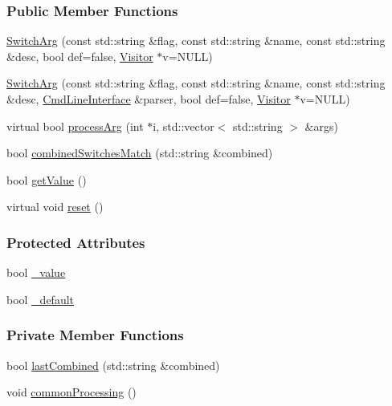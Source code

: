 \subsubsection*{Public Member Functions}
\begin{DoxyCompactItemize}
\item 
\hyperlink{classTCLAP_1_1SwitchArg_a3895b036fa2d36e4fcfa41dfcdb298c1}{Switch\+Arg} (const std\+::string \&flag, const std\+::string \&name, const std\+::string \&desc, bool def=false, \hyperlink{classTCLAP_1_1Visitor}{Visitor} $\ast$v=N\+U\+LL)
\item 
\hyperlink{classTCLAP_1_1SwitchArg_af7e9628155772af0686f6a2114dfe78b}{Switch\+Arg} (const std\+::string \&flag, const std\+::string \&name, const std\+::string \&desc, \hyperlink{classTCLAP_1_1CmdLineInterface}{Cmd\+Line\+Interface} \&parser, bool def=false, \hyperlink{classTCLAP_1_1Visitor}{Visitor} $\ast$v=N\+U\+LL)
\item 
virtual bool \hyperlink{classTCLAP_1_1SwitchArg_a624f98df6c4907efec95ffc353e9d08c}{process\+Arg} (int $\ast$i, std\+::vector$<$ std\+::string $>$ \&args)
\item 
bool \hyperlink{classTCLAP_1_1SwitchArg_af5fbd44d462539941b09e960034d692c}{combined\+Switches\+Match} (std\+::string \&combined)
\item 
bool \hyperlink{classTCLAP_1_1SwitchArg_aed1bc8a81a9bda4013cfcf407ccc7716}{get\+Value} ()
\item 
virtual void \hyperlink{classTCLAP_1_1SwitchArg_af8561d903ec3c11f5f2175e6db179d9c}{reset} ()
\end{DoxyCompactItemize}
\subsubsection*{Protected Attributes}
\begin{DoxyCompactItemize}
\item 
bool \hyperlink{classTCLAP_1_1SwitchArg_a0389ecebecc504d9756703d46e8cf3ca}{\+\_\+value}
\item 
bool \hyperlink{classTCLAP_1_1SwitchArg_ae25a99eb06fc2ee75a3b98edba1d5d8d}{\+\_\+default}
\end{DoxyCompactItemize}
\subsubsection*{Private Member Functions}
\begin{DoxyCompactItemize}
\item 
bool \hyperlink{classTCLAP_1_1SwitchArg_a8b609b058744c2bdc04f14ffabb4197f}{last\+Combined} (std\+::string \&combined)
\item 
void \hyperlink{classTCLAP_1_1SwitchArg_aa8febb767176919bd220b235bf4ea158}{common\+Processing} ()
\end{DoxyCompactItemize}
